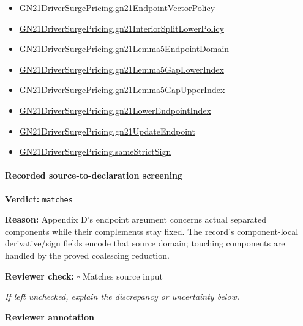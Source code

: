 \documentclass[10pt]{article}
\newcommand{\reviewerbox}{%
  \par\noindent\fbox{\parbox{0.96\linewidth}{\rule{0pt}{0.38in}}}\par
}
\newcommand{\reviewmatch}[1]{%
  \par\noindent\textbf{Reviewer check:} $\square$\; #1\par
  \noindent\emph{If left unchecked, explain the discrepancy or uncertainty below.}\par
}
\begin{document}
\begin{itemize}
\item \hyperlink{governing-declaration-fd9edd847ccb0b95}{GN21\allowbreak{}Driver\allowbreak{}Surge\allowbreak{}Pricing.\allowbreak{}gn21\allowbreak{}Endpoint\allowbreak{}Vector\allowbreak{}Policy}
\item \hyperlink{governing-declaration-7f3f9f9f72bb2cef}{GN21\allowbreak{}Driver\allowbreak{}Surge\allowbreak{}Pricing.\allowbreak{}gn21\allowbreak{}Interior\allowbreak{}Split\allowbreak{}Lower\allowbreak{}Policy}
\item \hyperlink{governing-declaration-a843d1c76c4f49f8}{GN21\allowbreak{}Driver\allowbreak{}Surge\allowbreak{}Pricing.\allowbreak{}gn21\allowbreak{}Lemma5\allowbreak{}Endpoint\allowbreak{}Domain}
\item \hyperlink{governing-declaration-3fa0ba58cfed6498}{GN21\allowbreak{}Driver\allowbreak{}Surge\allowbreak{}Pricing.\allowbreak{}gn21\allowbreak{}Lemma5\allowbreak{}Gap\allowbreak{}Lower\allowbreak{}Index}
\item \hyperlink{governing-declaration-216d8034f726a539}{GN21\allowbreak{}Driver\allowbreak{}Surge\allowbreak{}Pricing.\allowbreak{}gn21\allowbreak{}Lemma5\allowbreak{}Gap\allowbreak{}Upper\allowbreak{}Index}
\item \hyperlink{governing-declaration-f2a77a53381e03e7}{GN21\allowbreak{}Driver\allowbreak{}Surge\allowbreak{}Pricing.\allowbreak{}gn21\allowbreak{}Lower\allowbreak{}Endpoint\allowbreak{}Index}
\item \hyperlink{governing-declaration-7675bb3ed0a04be0}{GN21\allowbreak{}Driver\allowbreak{}Surge\allowbreak{}Pricing.\allowbreak{}gn21\allowbreak{}Update\allowbreak{}Endpoint}
\item \hyperlink{governing-declaration-867d0251c5f9e2dc}{GN21\allowbreak{}Driver\allowbreak{}Surge\allowbreak{}Pricing.\allowbreak{}same\allowbreak{}Strict\allowbreak{}Sign}
\end{itemize}
\paragraph{Recorded source-to-declaration screening}
\textbf{Verdict:} \texttt{matches}
\\
{\raggedright
\textbf{Reason:} Appendix D's endpoint argument concerns actual separated components while their complements stay fixed.\allowbreak{} The record's component-\allowbreak{}local derivative/\allowbreak{}sign fields encode that source domain;\allowbreak{} touching components are handled by the proved coalescing reduction.\allowbreak{}
\par}
\reviewmatch{Matches source input}
\noindent\textbf{Reviewer annotation}\par
\reviewerbox
\clearpage
\hypertarget{paper-prerequisite-d9323f0e5caa6a53}{}
\end{document}
